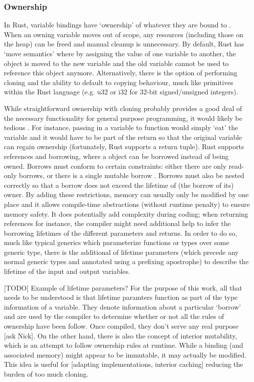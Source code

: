 \subsubsection{Ownership}
In Rust, variable bindings have `ownership' of whatever they are bound to \cite{docowner15}\cite{rustbook15}. When an owning variable moves out of scope, any resources (including those on the heap) can be freed and manual cleanup is unnecessary. By default, Rust has `move semantics' where by assigning the value of one variable to another, the object is moved to the new variable and the old variable cannot be used to reference this object anymore. Alternatively, there is the option of performing cloning and the ability to default to copying behaviour, much like primitives within the Rust language (e.g. u32 or i32 for 32-bit signed/unsigned integers).

While straightforward ownership with cloning probably provides a good deal of the necessary functionality for general purpose programming, it would likely be tedious \cite{docowner15}. For instance, passing in a variable to function would simply `eat' the variable and it would have to be part of the return so that the original variable can regain ownership (fortunately, Rust supports a return tuple). Rust supports references and borrowing, where a object can be borrowed instead of being owned. Borrows must conform to certain constraints: either there are only read-only borrows, or there is a single mutable borrow \cite{docborrow15}. Borrows must also be nested correctly so that a borrow does not exceed the lifetime of (the borrow of its) owner. By adding these restrictions, memory can usually only be modified by one place and it allows compile-time abstractions (without runtime penalty) to ensure memory safety. It does potentially add complexity during coding; when returning references for instance, the compiler might need additional help to infer the borrowing lifetimes of the different parameters and returns. In order to do so, much like typical generics which parameterize functions or types over some generic type, there is the additional of lifetime parameters (which precede any normal generic types and annotated using a prefixing apostrophe) to describe the lifetime of the input and output variables.

[TODO] Example of lifetime parameters? For the purpose of this work, all that needs to be understood is that lifetime paramters function as part of the type information of a variable. They denote information about a particular `borrow' and are used by the compiler to determine whether or not all the rules of ownership have been follow. Once compiled, they don't serve any real purpose [ask Nick]. On the other hand, there is also the concept of interior mutability, which is an attempt to follow ownership rules at runtime. While a binding (and associated memory) might appear to be immutable, it may actually be modified. This idea is useful for [adapting implementations, interior caching] reducing the burden of too much cloning.

